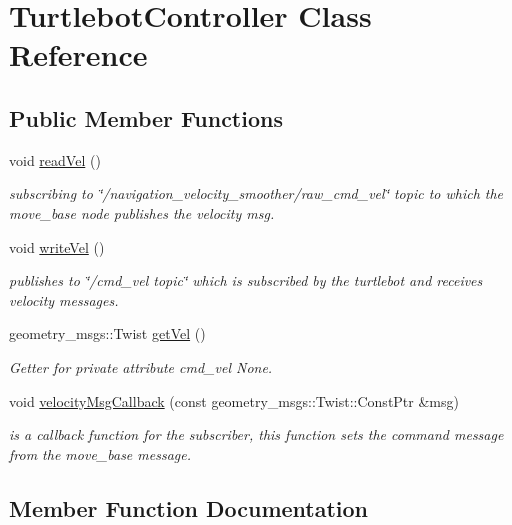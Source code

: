 \hypertarget{classTurtlebotController}{}\section{Turtlebot\+Controller Class Reference}
\label{classTurtlebotController}
\subsection*{Public Member Functions}
\begin{DoxyCompactItemize}
\item 
void \hyperlink{classTurtlebotController_ac5adcb19aebc875356e832f2836207d3}{read\+Vel} ()
\begin{DoxyCompactList}\small\item\em subscribing to \char`\"{}/navigation\+\_\+velocity\+\_\+smoother/raw\+\_\+cmd\+\_\+vel\char`\"{} topic to which the move\+\_\+base node publishes the velocity msg. \end{DoxyCompactList}\item 
void \hyperlink{classTurtlebotController_a650922e287d1c76c198079dd58ee714f}{write\+Vel} ()
\begin{DoxyCompactList}\small\item\em publishes to \char`\"{}/cmd\+\_\+vel topic\char`\"{} which is subscribed by the turtlebot and receives velocity messages. \end{DoxyCompactList}\item 
geometry\+\_\+msgs\+::\+Twist \hyperlink{classTurtlebotController_ab2c9ea0da12fdd6bfa7207a3c396909b}{get\+Vel} ()
\begin{DoxyCompactList}\small\item\em Getter for private attribute cmd\+\_\+vel  None. \end{DoxyCompactList}\item 
void \hyperlink{classTurtlebotController_a697288c1c84177a9c51a71ae447f89fb}{velocity\+Msg\+Callback} (const geometry\+\_\+msgs\+::\+Twist\+::\+Const\+Ptr \&msg)
\begin{DoxyCompactList}\small\item\em is a callback function for the subscriber, this function sets the command message from the move\+\_\+base message. \end{DoxyCompactList}\end{DoxyCompactItemize}


\subsection{Member Function Documentation}
